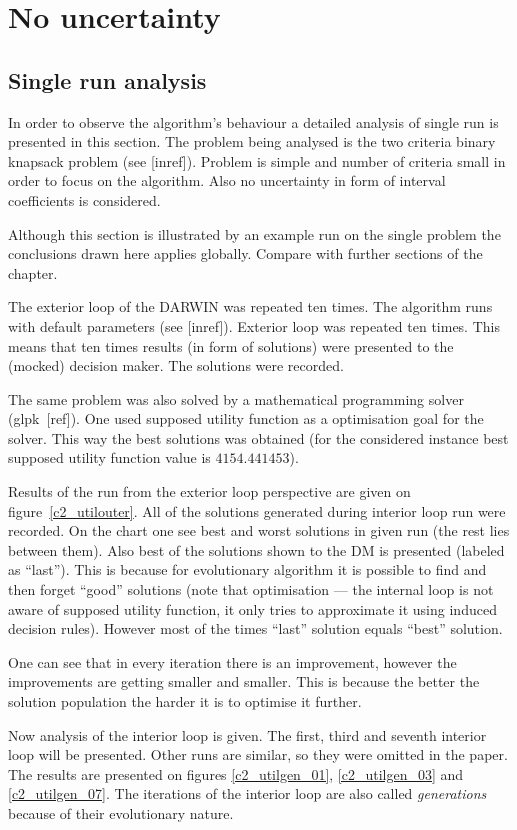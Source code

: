 \section{No uncertainty}
\subsection{Single run analysis}
In order to observe the algorithm's behaviour a detailed analysis of single
run is presented in this section. The problem being analysed is the two
criteria binary knapsack problem (see [inref]). Problem is simple and number
of criteria small in order to focus on the algorithm. Also no uncertainty in
form of interval coefficients is considered.

Although this section is illustrated by an example run on the single problem
the conclusions drawn here applies globally. Compare with further sections of
the chapter.

The exterior loop of the DARWIN was repeated ten times. The algorithm runs
with default parameters (see [inref]). Exterior loop was repeated ten
times. This means that ten times results (in form of solutions) were presented
to the (mocked) decision maker. The solutions were recorded.

The same problem was also solved by a mathematical programming solver
(glpk~[ref]). One used supposed utility function as a optimisation goal for
the solver. This way the best solutions was obtained (for the considered
instance best supposed utility function value is $4154.441453$).

Results of the run from the exterior loop perspective are given on
figure~\ref{c2_utilouter}. All of the solutions generated during interior loop
run were recorded. On the chart one see best and worst solutions in given run
(the rest lies between them). Also best of the solutions shown to the DM is
presented (labeled as ``last''). This is because for evolutionary algorithm it
is possible to find and then forget ``good'' solutions (note that optimisation
--- the internal loop is not aware of supposed utility function, it only tries
to approximate it using induced decision rules). However most of the times
``last'' solution equals ``best'' solution.

One can see that in every iteration there is an improvement, however the
improvements are getting smaller and smaller. This is because the better the
solution population the harder it is to optimise it further.

Now analysis of the interior loop is given. The first, third and seventh
interior loop will be presented. Other runs are similar, so they were omitted
in the paper. The results are presented on figures \ref{c2_utilgen_01},
\ref{c2_utilgen_03} and \ref{c2_utilgen_07}. The iterations of the interior
loop are also called \textit{generations} because of their evolutionary
nature.

